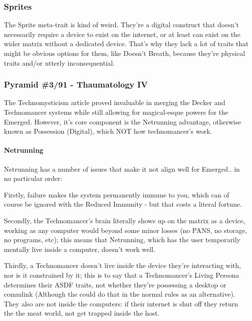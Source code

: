 \begin{multicols*}{2}
	\subsubsection{Sprites}
	
	The Sprite meta-trait is kind of weird. They're a digital construct that doesn't necessarily require a device to exist on the internet, or at least can exist on the wider matrix without a dedicated device. That's why they lack a lot of traits that might be obvious options for them, like Doesn't Breath, because they're physical traits and/or utterly inconsequential.
	
	\subsubsection{\GURPS Pyramid \#3/91 - Thaumatology IV}
	
	The Technomysticism article proved invaluable in merging the Decker and Technomancer systems while still allowing for magical-esque powers for the Emerged. However, it's core component is the Netrunning advantage, otherwise known as Possession (Digital), which NOT how technomancer's work.
	
	\paragraph{Netrunning}
	
	Netrunning has a number of issues that make it not align well for Emerged.. in no particular order: 
	
	Firstly, failure makes the system permanently immune to you, which can of course be ignored with the Reduced Immunity - but that costs a literal fortune. 
	
	Secondly, the Technomancer's brain literally shows up on the matrix as a device, working as any computer would beyond some minor losses (no PANS, no storage, no programs, etc); this means that Netrunning, which has the user temporarily mentally live inside a computer, doesn't work well. 
	
	Thirdly, a Technomancer doesn't live inside the device they're interacting with, nor is it constrained by it; this is to say that a Technomancer's Living Persona determines their ASDF traits, not whether they're possessing a desktop or commlink (Although the could do that in the normal rules as an alternative). They also are not inside the computers: if their internet is shut off they return the the meat world, not get trapped inside the host.
	

\end{multicols*}
